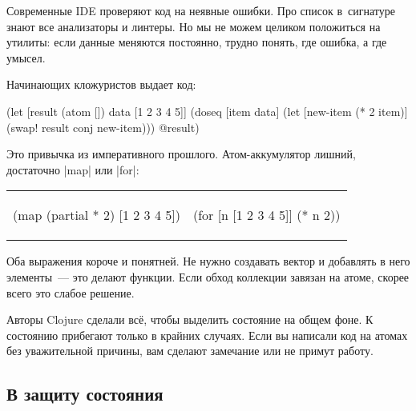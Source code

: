 Современные IDE проверяют код на неявные ошибки. Про список в~сигнатуре знают
все анализаторы и линтеры. Но мы не можем целиком положиться на утилиты: если
данные меняются постоянно, трудно понять, где ошибка, а где умысел.

Начинающих кложуристов выдает код:

\begin{english}
  \begin{clojure}
(let [result (atom [])
      data [1 2 3 4 5]]
  (doseq [item data]
    (let [new-item (* 2 item)]
      (swap! result conj new-item)))
  @result)
  \end{clojure}
\end{english}


\noindent
Это привычка из императивного прошлого. Атом-аккумулятор лишний, достаточно
\spverb|map| или \spverb|for|:


\noindent
\begin{tabular}{ @{}p{5cm} @{}p{5cm} }

\begin{english}
  \begin{clojure}
(map (partial * 2)
     [1 2 3 4 5])
  \end{clojure}
\end{english}

&

\begin{english}
  \begin{clojure}
(for [n [1 2 3 4 5]]
  (* n 2))
  \end{clojure}
\end{english}

\end{tabular}

Оба выражения короче и понятней. Не нужно создавать вектор и добавлять в него
элементы~--- это делают функции. Если обход коллекции завязан на
атоме, скорее всего это слабое решение.

Авторы Clojure сделали вс\"{е}, чтобы выделить состояние на общем фоне. К
состоянию прибегают только в крайних случаях. Если вы написали код на атомах без
уважительной причины, вам сделают замечание или не примут работу.


\subsection{В защиту состояния}

